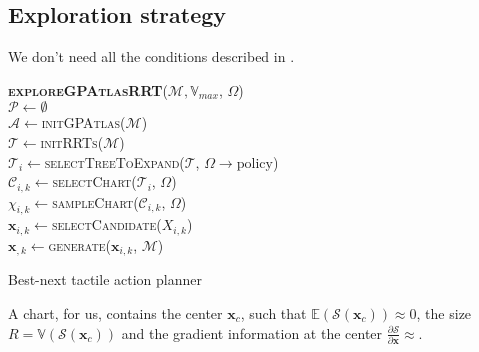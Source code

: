 \subsection{Exploration strategy}
\label{sec:strategy}

We don't need all the conditions described in \citet[Fig.~8]{Jaillet2013Path}.

\begin{algorithm}[h]
\textbf{\textsc{exploreGPAtlasRRT}}($\mathcal{M}, \mathbb{V}_{max}$, $\Omega$)\\ %
\LinesNumbered
\DontPrintSemicolon
\SetAlgoVlined {} 
  $\mathcal{P} \leftarrow \emptyset$ \\
  $\mathcal{A} \leftarrow$\textsc{initGPAtlas}($\mathcal{M}$) \\
  $\mathcal{T} \leftarrow$\textsc{initRRTs}($\mathcal{M}$) \\
  {
    $\mathcal{T}_{i} \leftarrow$\textsc{selectTreeToExpand}($\mathcal{T}$, $\Omega \rightarrow \text{policy}$) \\

    $\mathcal{C}_{i,k} \leftarrow$\textsc{selectChart}($\mathcal{T}_{i}$, $\Omega$) \\ 
    
    $\chi_{i,k} \leftarrow$\textsc{sampleChart}($\mathcal{C}_{i,k}$, $\Omega$) \\

    $\mathbf{x}_{i,k} \leftarrow$\textsc{selectCandidate}($X_{i,k}$) \\
    $\mathbf{x}_{,k} \leftarrow$\textsc{generate}($\mathbf{x}_{i,k}$, $\mathcal{M}$) \\

    \Return{$\varnothing$}
  }

\caption{Best-next tactile action planner} \label{alg:strategy}
\end{algorithm}

A chart, for us, contains the center $\mathbf{x}_c$, such that $\mathbb{E}(\mathcal{S}(\mathbf{x}_c)) \approx 0$, the size $R = \mathbb{V}(\mathcal{S}(\mathbf{x}_c))$ and the gradient information at the center $\frac{\partial \mathcal{S}}{\partial \mathbf{x}} \approx $.

